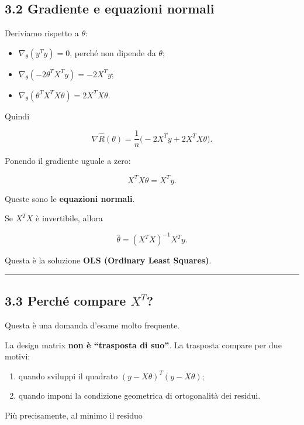 \documentclass{article}
\providecommand{\tightlist}{%
  \setlength{\itemsep}{0pt}\setlength{\parskip}{0pt}}
\begin{document}
\subsection{3.2 Gradiente e equazioni
normali}\label{gradiente-e-equazioni-normali}

Deriviamo rispetto a \(\theta\):

\begin{itemize}
\tightlist
\item
  \(\nabla_\theta(y^Ty)=0\), perché non dipende da \(\theta\);
\item
  \(\nabla_\theta(-2\theta^TX^Ty)=-2X^Ty\);
\item
  \(\nabla_\theta(\theta^TX^TX\theta)=2X^TX\theta\).
\end{itemize}

Quindi

\[
\nabla \hat R(\theta)=\frac{1}{n}\big(-2X^Ty+2X^TX\theta\big).
\]

Ponendo il gradiente uguale a zero:

\[
X^TX\theta=X^Ty.
\]

Queste sono le \textbf{equazioni normali}.

Se \(X^TX\) è invertibile, allora

\[
\hat\theta = (X^TX)^{-1}X^Ty.
\]

Questa è la soluzione \textbf{OLS (Ordinary Least Squares)}.

\begin{center}\rule{0.5\linewidth}{0.5pt}\end{center}

\subsection{\texorpdfstring{3.3 Perché compare
\(X^T\)?}{3.3 Perché compare X\^{}T?}}\label{perchuxe9-compare-xt}

Questa è una domanda d'esame molto frequente.

La design matrix \textbf{non è ``trasposta di suo''}. La trasposta
compare per due motivi:

\begin{enumerate}
\def\labelenumi{\arabic{enumi}.}
\tightlist
\item
  quando sviluppi il quadrato \((y-X\theta)^T(y-X\theta)\);
\item
  quando imponi la condizione geometrica di ortogonalità dei residui.
\end{enumerate}

Più precisamente, al minimo il residuo
\end{document}
